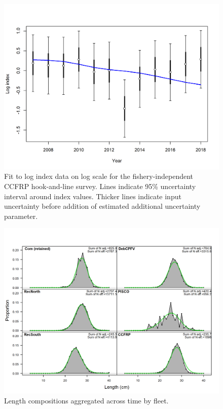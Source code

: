 \documentclass[12pt,]{article}
\begin{document}
\FloatBarrier

\begin{figure}
\centering
\includegraphics{r4ss/plots_mod1/index5_logcpuefit_CCFRP.png}
\caption{Fit to log index data on log scale for the fishery-independent
CCFRP hook-and-line survey. Lines indicate 95\% uncertainty interval
around index values. Thicker lines indicate input uncertainty before
addition of estimated additional uncertainty parameter.
\label{fig:index5_logcpuefit_CCFRP}}
\end{figure}

\FloatBarrier 

\begin{figure}
\centering
\includegraphics{r4ss/plots_mod1/comp_lenfit__aggregated_across_time.png}
\caption{Length compositions aggregated across time by fleet.
\label{fig:comp_lenfit__aggregated_across_time}}
\end{figure}
\end{document}
